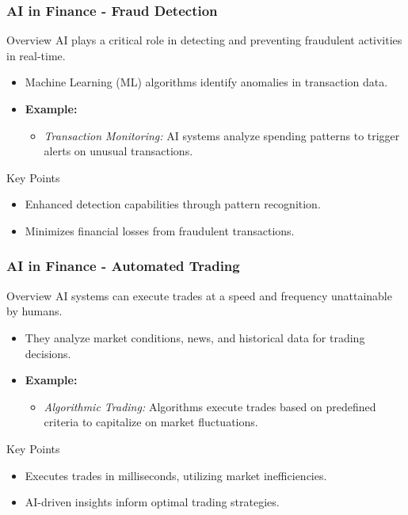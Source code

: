 \documentclass[aspectratio=169]{beamer}
\begin{document}
\begin{frame}[fragile]
    \frametitle{AI in Finance - Fraud Detection}
    \begin{block}{Overview}
        AI plays a critical role in detecting and preventing fraudulent activities in real-time.
    \end{block}
    \begin{itemize}
        \item Machine Learning (ML) algorithms identify anomalies in transaction data.
        \item \textbf{Example:} 
        \begin{itemize}
            \item \textit{Transaction Monitoring:} AI systems analyze spending patterns to trigger alerts on unusual transactions.
        \end{itemize}
    \end{itemize}
    \begin{block}{Key Points}
        \begin{itemize}
            \item Enhanced detection capabilities through pattern recognition.
            \item Minimizes financial losses from fraudulent transactions.
        \end{itemize}
    \end{block}
\end{frame}

\begin{frame}[fragile]
    \frametitle{AI in Finance - Automated Trading}
    \begin{block}{Overview}
        AI systems can execute trades at a speed and frequency unattainable by humans.
    \end{block}
    \begin{itemize}
        \item They analyze market conditions, news, and historical data for trading decisions.
        \item \textbf{Example:} 
        \begin{itemize}
            \item \textit{Algorithmic Trading:} Algorithms execute trades based on predefined criteria to capitalize on market fluctuations.
        \end{itemize}
    \end{itemize}
    \begin{block}{Key Points}
        \begin{itemize}
            \item Executes trades in milliseconds, utilizing market inefficiencies.
            \item AI-driven insights inform optimal trading strategies.
        \end{itemize}
    \end{block}
\end{frame}
\end{document}
